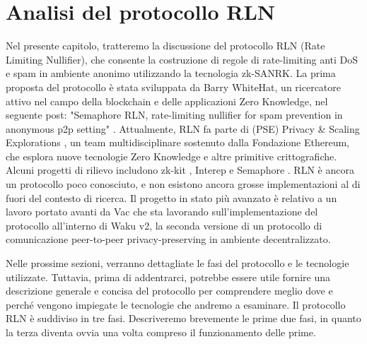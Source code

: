 \chapter{Analisi del protocollo RLN}
\label{chap:rln-protocol}

Nel presente capitolo, tratteremo la discussione del protocollo RLN (Rate Limiting Nullifier), che consente la
costruzione di regole di rate-limiting anti DoS e spam in ambiente anonimo utilizzando la tecnologia zk-SANRK. La prima proposta del protocollo è stata
sviluppata da Barry WhiteHat, un ricercatore attivo nel campo della blockchain e delle applicazioni Zero Knowledge, nel
seguente post: "Semaphore RLN, rate-limiting nullifier for spam prevention in anonymous p2p setting" \cite{semaphore-rln}. Attualmente, RLN
fa parte di (PSE) Privacy \& Scaling Explorations \cite{pse}, un team multidisciplinare sostenuto dalla Fondazione Ethereum, che
esplora nuove tecnologie Zero Knowledge e altre primitive crittografiche. Alcuni progetti di rilievo includono zk-kit \cite{zk-kit},
Interep \cite{interep} e Semaphore \cite{semaphore}. RLN è ancora un protocollo poco conosciuto, e non esistono ancora grosse implementazioni al di
fuori del contesto di ricerca. Il progetto in stato più avanzato è relativo a un lavoro portato avanti da Vac che sta
lavorando sull'implementazione del protocollo all'interno di Waku v2, la seconda versione di un protocollo di
comunicazione peer-to-peer privacy-preserving in ambiente decentralizzato.

Nelle prossime sezioni, verranno dettagliate le fasi del protocollo e le tecnologie utilizzate. Tuttavia, prima di
addentrarci, potrebbe essere utile fornire una descrizione generale e concisa del protocollo per comprendere meglio dove
e perché vengono impiegate le tecnologie che andremo a esaminare. Il protocollo RLN è suddiviso in tre fasi. Descriveremo brevemente le prime due fasi, in quanto la terza diventa ovvia una volta compreso il funzionamento delle prime.


